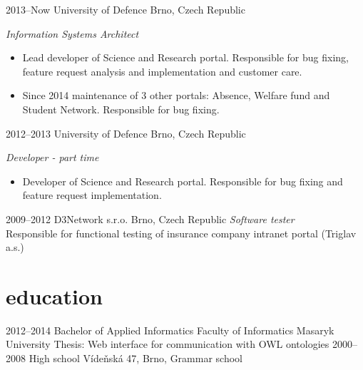 \documentclass['print']{friggeri-cv} %
\begin{document}
\begin{entrylist}
\entry
{2013--Now}
{University of Defence}
{Brno, Czech Republic}
{\emph{Information Systems Architect} \\
\begin{itemize}
\item Lead developer of Science and Research portal. Responsible for bug fixing, feature request analysis and implementation and customer care.  \\
\item
Since 2014 maintenance of 3 other portals: Absence, Welfare fund and Student Network. Responsible for bug fixing.\\
\end{itemize}
}
\entry
{2012--2013}
{University of Defence}
{Brno, Czech Republic}
{\emph{Developer - part time} \\
\begin{itemize}
\item
Developer of Science and Research portal. Responsible for bug fixing and feature request implementation.  \\
\end{itemize}
}
\entry
{2009--2012}
{D3Network s.r.o.}
{Brno, Czech Republic}
{\emph{Software tester} \\
Responsible for functional testing of insurance company intranet portal (Triglav a.s.)}
\end{entrylist}

\section{education}

\begin{entrylist}
\entry
{2012--2014}
{Bachelor {\normalfont of Applied Informatics}}
{Faculty of Informatics Masaryk University}
{Thesis: Web interface for communication with OWL ontologies}
\entry
{2000--2008}
{High school}
{Vídeňská 47, Brno, Grammar school}

\end{entrylist}
\end{document}
